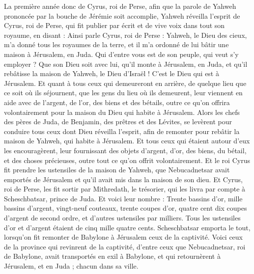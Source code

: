 \begin{multicols}{2}
\VerseOne{}La première année donc de Cyrus, roi de Perse, afin que la parole de Yahweh prononcée par la bouche de Jérémie soit accomplie, Yahweh réveilla l'esprit de Cyrus, roi de Perse, qui fit publier par écrit et de vive voix dans tout son royaume, en disant :
Ainsi parle Cyrus, roi de Perse : Yahweh, le Dieu des cieux, m'a donné tous les royaumes de la terre, et il m'a ordonné de lui bâtir une maison à Jérusalem, en Juda.
Qui d'entre vous est de son peuple, qui veut s'y employer ? Que son Dieu soit avec lui, qu'il monte à Jérusalem, en Juda, et qu'il rebâtisse la maison de Yahweh, le Dieu d'Israël ! C'est le Dieu qui est à Jérusalem.
Et quant à tous ceux qui demeureront en arrière, de quelque lieu que ce soit où ils séjournent, que les gens du lieu où ils demeurent, leur viennent en aide avec de l'argent, de l'or, des biens et des bétails, outre ce qu'on offrira volontairement pour la maison du Dieu qui habite à Jérusalem.
Alors les chefs des pères de Juda, de Benjamin, des prêtres et des Lévites, se levèrent pour conduire tous ceux dont Dieu réveilla l'esprit, afin de remonter pour rebâtir la maison de Yahweh, qui habite à Jérusalem.
Et tous ceux qui étaient autour d'eux les encouragèrent, leur fournissant des objets d'argent, d'or, des biens, du bétail, et des choses précieuses, outre tout ce qu'on offrit volontairement.
Et le roi Cyrus fit prendre les ustensiles de la maison de Yahweh, que Nebucadnetsar avait emportés de Jérusalem et qu'il avait mis dans la maison de son dieu.
Et Cyrus, roi de Perse, les fit sortir par Mithredath, le trésorier, qui les livra par compte à Scheschbatsar, prince de Juda.
Et voici leur nombre : Trente bassins d'or, mille bassins d'argent, vingt-neuf couteaux,
trente coupes d'or, quatre cent dix coupes d'argent de second ordre, et d'autres ustensiles par milliers.
Tous les ustensiles d'or et d'argent étaient de cinq mille quatre cents. Scheschbatsar emporta le tout, lorsqu'on fit remonter de Babylone à Jérusalem ceux de la captivité.
\VerseOne{}Voici ceux de la province qui revinrent de la captivité, d'entre ceux que Nebucadnetsar, roi de Babylone, avait transportés en exil à Babylone, et qui retournèrent à Jérusalem, et en Juda ; chacun dans sa ville.

\end{multicols}
